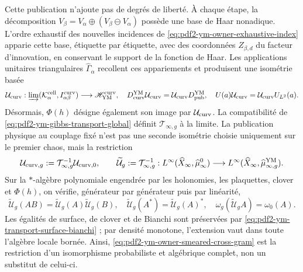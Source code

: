 Cette publication n'ajoute pas de degrés de liberté. À chaque étape, la décomposition $V_\beta=V_\alpha\oplus(V_\beta\ominus V_\alpha)$ possède une base de Haar nonadique. L'ordre exhaustif des nouvelles incidences de \eqref{eq:pdf2-ym-owner-exhaustive-index} apparie cette base, étiquette par étiquette, avec des coordonnées $Z_{\beta,d}$ du facteur d'innovation, en conservant le support de la fonction de Haar. Les applications unitaires triangulaires $\widehat\Gamma_\alpha$ recollent ces appariements et produisent une isométrie basée
\begin{equation}\label{eq:pdf2-ym-owner-publication-into-physical}
 \mathcal U_{\rm curv}:
 \varinjlim(\mathcal K_\alpha^{\rm cell},I_{\alpha\beta}^{\rm curv})
 \longrightarrow\mathscr H_{\rm YM}^{\rm curv},
 \quad
 D_{\rm curv}^{\rm YM}\mathcal U_{\rm curv}
 =\mathcal U_{\rm curv}D_{\rm pub}^{\rm YM},
 \quad U(a)\mathcal U_{\rm curv}=\mathcal U_{\rm curv}U_{L^2}(a).
\end{equation}
Désormais, $\Phi(h)$ désigne également son image par $\mathcal U_{\rm curv}$.
La compatibilité de \eqref{eq:pdf2-ym-gibbs-transport-global} définit
$\mathcal T_{\infty,g}$ à la limite. La publication physique au couplage fixé
n’est pas une seconde isométrie choisie uniquement sur le premier chaos, mais la restriction
\begin{equation}\label{eq:pdf2-ym-full-publication-restriction}
 \mathcal U_{{\rm curv},g}
 :=\mathcal T_{\infty,g}^{-1}\mathcal U_{{\rm curv},0},
 \qquad
 \widetilde{\mathcal U}_g
 :=\mathcal T_{\infty,g}^{-1}:
 L^\infty(\widehat X_\infty,\widehat\mu_\infty^0)
 \longrightarrow
 L^\infty(\widehat X_\infty,\widehat\mu_{\infty,g}^{\rm YM}).
\end{equation}
Sur la $*$-algèbre polynomiale engendrée par les holonomies, les plaquettes, clover et
$\Phi(h)$, on vérifie, générateur par générateur puis par linéarité,
\begin{equation}\label{eq:pdf2-ym-full-publication-products}
 \widetilde{\mathcal U}_g(AB)
 =\widetilde{\mathcal U}_g(A)\widetilde{\mathcal U}_g(B),
 \quad
 \widetilde{\mathcal U}_g(A^*)=\widetilde{\mathcal U}_g(A)^*,
 \quad
 \omega_g(\widetilde{\mathcal U}_gA)=\omega_0(A).
\end{equation}
Les égalités de surface, de clover et de Bianchi sont préservées par
\eqref{eq:pdf2-ym-transport-surface-bianchi} ; par densité monotone, l’extension
vaut dans toute l’algèbre locale bornée. Ainsi,
\eqref{eq:pdf2-ym-owner-smeared-cross-gram} est la restriction d’un isomorphisme
probabiliste et algébrique complet, non un substitut de celui-ci.

